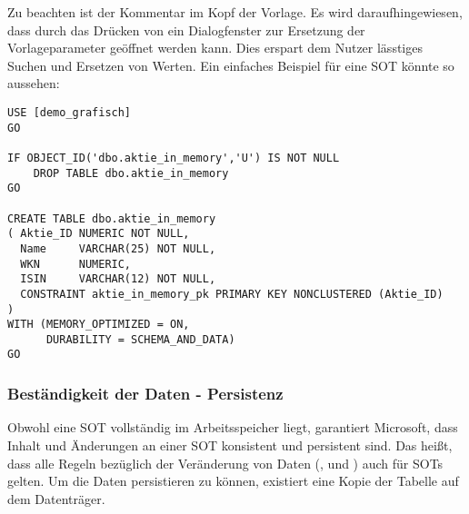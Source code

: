           Zu beachten ist der Kommentar im Kopf der Vorlage.
          Es wird daraufhingewiesen, dass durch das Drücken von
           ein Dialogfenster zur Ersetzung der
          Vorlageparameter geöffnet werden kann. Dies erspart dem Nutzer
          lässtiges Suchen und Ersetzen von Werten.
          Ein einfaches Beispiel für eine SOT könnte so aussehen:
          \begin{lstlisting}[language=ms_sql, caption={Erstellen einer
          Speicheroptimierten Tabelle}, label=admin05_06]
USE [demo_grafisch]
GO

IF OBJECT_ID('dbo.aktie_in_memory','U') IS NOT NULL
    DROP TABLE dbo.aktie_in_memory
GO

CREATE TABLE dbo.aktie_in_memory
( Aktie_ID NUMERIC NOT NULL, 
  Name     VARCHAR(25) NOT NULL,
  WKN      NUMERIC,
  ISIN     VARCHAR(12) NOT NULL,
  CONSTRAINT aktie_in_memory_pk PRIMARY KEY NONCLUSTERED (Aktie_ID)
) 
WITH (MEMORY_OPTIMIZED = ON, 
      DURABILITY = SCHEMA_AND_DATA)
GO
          \end{lstlisting}
          \begin{literaturinternet}
            \item \cite{dn205318}
          \end{literaturinternet}
        \subsubsection{Beständigkeit der Daten - Persistenz}
          Obwohl eine SOT vollständig im Arbeitsspeicher liegt, garantiert
          Microsoft, dass Inhalt und Änderungen an einer SOT konsistent und
          persistent sind. Das heißt, dass alle Regeln bezüglich der Veränderung
          von Daten (\INSERT, \UPDATE{} und \DELETE) auch für SOTs gelten. Um die
          Daten persistieren zu können, existiert eine Kopie der Tabelle auf dem
          Datenträger.
